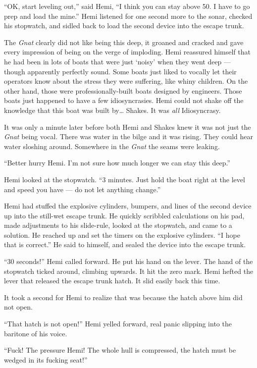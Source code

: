 \documentclass[]{scrbook}
\begin{document}
``OK, start leveling out,'' said Hemi, ``I think you can stay above 50.
I have to go prep and load the mine.'' Hemi listened for one second more
to the sonar, checked his stopwatch, and sidled back to load the second
device into the escape trunk.

The \emph{Gnat} clearly did not like being this deep, it groaned and
cracked and gave every impression of being on the verge of imploding.
Hemi reassured himself that he had been in lots of boats that were just
`noisy' when they went deep --- though apparently perfectly sound. Some
boats just liked to vocally let their operators know about the stress
they were suffering, like whiny children. On the other hand, those were
professionally-built boats designed by engineers. Those boats just
happened to have a few idiosyncrasies. Hemi could not shake off the
knowledge that this boat was built by\ldots{} Shakes. It was \emph{all}
Idiosyncrasy.

It was only a minute later before both Hemi and Shakes knew it was not
just the \emph{Gnat} being vocal. There was water in the bilge and it
was rising. They could hear water sloshing around. Somewhere in the
\emph{Gnat} the seams were leaking.

``Better hurry Hemi. I'm not sure how much longer we can stay this
deep.''

Hemi looked at the stopwatch. ``3 minutes. Just hold the boat right at
the level and speed you have --- do not let anything change.''

Hemi had stuffed the explosive cylinders, bumpers, and lines of the
second device up into the still-wet escape trunk. He quickly scribbled
calculations on his pad, made adjustments to his slide-rule, looked at
the stopwatch, and came to a solution. He reached up and set the timers
on the explosive cylinders. ``I hope that is correct.'' He said to
himself, and sealed the device into the escape trunk.

``30 seconds!'' Hemi called forward. He put his hand on the lever. The
hand of the stopwatch ticked around, climbing upwards. It hit the zero
mark. Hemi hefted the lever that released the escape trunk hatch. It
slid easily back this time.

It took a second for Hemi to realize that was because the hatch above
him did not open.

``That hatch is not open!'' Hemi yelled forward, real panic slipping
into the baritone of his voice.

``Fuck! The pressure Hemi! The whole hull is compressed, the hatch must
be wedged in its fucking seat!''
\end{document}
